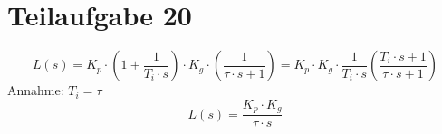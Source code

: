 \section{Teilaufgabe 20}
\[ L(s) = K_p \cdot \left(1 + \frac{1}{T_i \cdot s}\right)
    \cdot K_g \cdot \left(\frac{1}{\tau \cdot s + 1}\right)
    = K_p \cdot K_g \cdot \frac{1}{T_i \cdot s} 
        \left(\frac{T_i \cdot s + 1}{\tau \cdot s + 1}\right)
\]
Annahme: $T_i = \tau$
\[ L(s) = \frac{K_p \cdot K_g}{\tau \cdot s} \]
